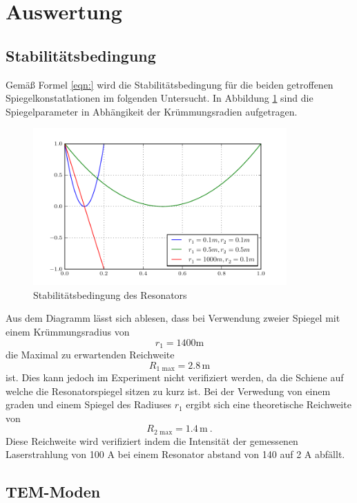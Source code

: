 \section{Auswertung}
\label{sec:Auswertung}

\subsection{Stabilitätsbedingung}
Gemäß Formel \ref{eqn:} wird die Stabilitätsbedingung für die beiden getroffenen Spiegelkonstatlationen im folgenden Untersucht. In Abbildung \ref{fig:stabi} sind die Spiegelparameter in Abhängikeit der Krümmungsradien aufgetragen. 
\begin{figure}
  \centering
  \includegraphics[height=6cm]{Stabilisationsparameter.pdf} 
  \caption{Stabilitätsbedingung des Resonators}
  \label{fig:stabi}
\end{figure}
Aus dem Diagramm lässt sich ablesen, dass bei Verwendung zweier Spiegel mit einem Krümmungsradius von 
\begin{equation}
  r_1 = 1400 \text{m}
  \label{eqn:rad1}
\end{equation}
die Maximal zu erwartenden Reichweite
\begin{equation}
  R_\text{1 max} = 2.8 \, \text{m}
  \label{eqn:rmax1}
\end{equation}
ist. Dies kann jedoch im Experiment nicht verifiziert werden, da die Schiene auf welche die Resonatorspiegel sitzen zu kurz ist. Bei der Verwedung von einem graden und einem Spiegel des Radiuses $r_1$ ergibt sich eine theoretische Reichweite von
\begin{equation}
  R_\text{2 max} = 1.4 \, \text{m} \ .
  \label{eqn:rmax2}
\end{equation}
Diese Reichweite wird verifiziert indem die Intensität der gemessenen Laserstrahlung von 100 \mu A bei einem Resonator abstand von 140 auf 2 \mu A abfällt. 

\subsection{TEM-Moden}

